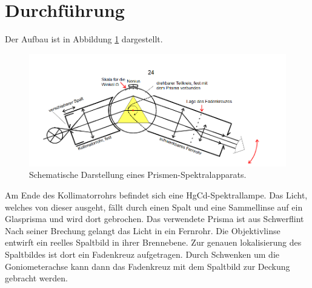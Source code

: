 \section{Durchführung}
\label{sec:Durchführung}
Der Aufbau ist in Abbildung \ref{fig:spek} dargestellt.
\begin{figure}[H]
  \centering
  \includegraphics[width=\textwidth]{content/pris_spek.png}
  \caption{Schematische Darstellung eines Prismen-Spektralapparats\cite{v402}.}
  \label{fig:spek}
\end{figure}
\noindent Am Ende des Kollimatorrohrs befindet sich eine HgCd-Spektrallampe.
Das Licht, welches von dieser ausgeht, fällt durch einen Spalt und eine Sammellinse auf ein Glasprisma und wird dort gebrochen.
Das verwendete Prisma ist aus Schwerflint
Nach seiner Brechung gelangt das Licht in ein Fernrohr.
Die Objektivlinse entwirft ein reelles Spaltbild in ihrer Brennebene.
Zur genauen lokalisierung des Spaltbildes ist dort ein Fadenkreuz aufgetragen.
Durch Schwenken um die Goniometerachse kann dann das Fadenkreuz mit dem Spaltbild zur Deckung gebracht werden.
